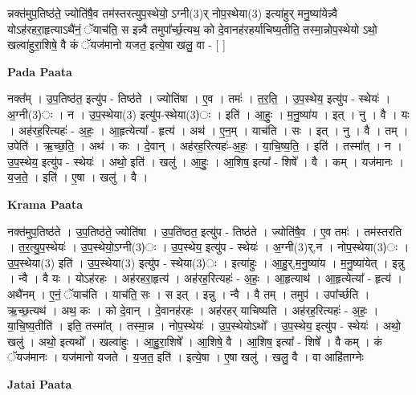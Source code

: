 \documentclass[17pt]{extarticle}
\begin{document}
न्नक्त॑मुप॒तिष्ठ॑ते॒ ज्योति॑षै॒व तम॑स्तरत्युप॒स्थेयो॒ ऽग्नी(3)र् नोप॒स्थेया(3) इत्या॑हुर् मनु॒ष्या॑येन्न्वै योऽह॑रहरा॒हृत्याऽथै॑नं॒ ॅयाच॑ति॒ स इन्न्वै तमुपा᳚र्च्छ॒त्यथ॒ को दे॒वानह॑रहर्याचिष्य॒तीति॒ तस्मा॒न्नोप॒स्थेयो ऽथो॒ खल्वा॑हुरा॒शिषे॒ वै कं ॅयज॑मानो यजत॒ इत्ये॒षा खलु॒ वा - [ ] \newline

\textbf{Pada Paata} \newline

नक्त᳚म् । उ॒प॒तिष्ठ॑त॒ इत्यु॑प - तिष्ठ॑ते । ज्योति॑षा । ए॒व । तमः॑ । त॒र॒ति॒ । उ॒प॒स्थेय॒ इत्यु॑प - स्थेयः॑ । अ॒ग्नी(3)ः । न । उ॒प॒स्थेया(3) इत्यु॑प-स्थेया(3)ः । इति॑ । आ॒हुः॒ । म॒नु॒ष्या॑य । इत् । नु । वै । यः । अह॑रह॒रित्यहः॑ - अ॒हः॒ । आ॒हृत्येत्या᳚ - हृत्य॑ । अथ॑ । ए॒न॒म् । याच॑ति । सः । इत् । नु । वै । तम् । उपेति॑ । ऋ॒च्छ॒ति॒ । अथ॑ । कः । दे॒वान् । अह॑रह॒रित्यहः॑-अ॒हः॒ । या॒चि॒ष्य॒ति॒ । इति॑ । तस्मा᳚त् । न । उ॒प॒स्थेय॒ इत्यु॑प - स्थेयः॑ । अथो॒ इति॑ । खलु॑ । आ॒हुः॒ । आ॒शिष॒ इत्या᳚ - शिषे᳚ । वै । कम् । यज॑मानः । य॒ज॒ते॒ । इति॑ । ए॒षा । खलु॑ । वै ।  \newline


\textbf{Krama Paata} \newline

नक्त॑मुप॒तिष्ठ॑ते । उ॒प॒तिष्ठ॑ते॒ ज्योति॑षा । उ॒प॒ति॑ष्ठत॒ इत्यु॑प - तिष्ठ॑ते । ज्योति॑षै॒व । ए॒व तमः॑ । तम॑स्तरति । त॒र॒त्यु॒प॒स्थेयः॑ । उ॒प॒स्थेयो॒ऽग्नी(3)ः । उ॒प॒स्थेय॒ इत्यु॑प - स्थेयः॑ । अ॒ग्नी(3)र्,न । नोप॒स्थेया(3)ः । उ॒प॒स्थेया(3) इति॑ । उ॒प॒स्थेया(3) इत्यु॑प - स्थेया(3)ः । इत्या॑हुः । आ॒हु॒र्,म॒नु॒ष्या॑य । म॒नु॒ष्या॑येत् । इन्नु । न्वै । वै यः । योऽह॑रहः । अह॑रहरा॒हृत्य॑ । अह॑रह॒रित्यहः॑ - अ॒हः॒ । आ॒हृत्याथ॑ । आ॒हृत्येत्या᳚ - हृत्य॑ । अथै॑नम् । ए॒नं॒ ॅयाच॑ति । याच॑ति॒ सः । स इत् । इन्नु । न्वै । वै तम् । तमुप॑ । उपा᳚र्च्छति । ऋ॒च्छ॒त्यथ॑ । अथ॒ कः । को दे॒वान् । दे॒वानह॑रहः । अह॑रहर् याचिष्यति । अह॑रह॒रित्यहः॑ - अ॒हः॒ । या॒चि॒ष्य॒तीति॑ । इति॒ तस्मा᳚त् । तस्मा॒न्न । नोप॒स्थेयः॑ । उ॒प॒स्थेयोऽथो᳚ । उ॒प॒स्थेय॒ इत्यु॑प - स्थेयः॑ । अथो॒ खलु॑ । अथो॒ इत्यथो᳚ । खल्वा॑हुः । आ॒हु॒रा॒शिषे᳚ । आ॒शिषे॒ वै । आ॒शिष॒ इत्या᳚ - शिषे᳚ । वै कम् । कं ॅयज॑मानः । यज॑मानो यजते । य॒ज॒त॒ इति॑ । इत्ये॒षा । ए॒षा खलु॑ । खलु॒ वै । वा आहि॑ताग्नेः \newline

\textbf{Jatai Paata} \newline
\end{document}
